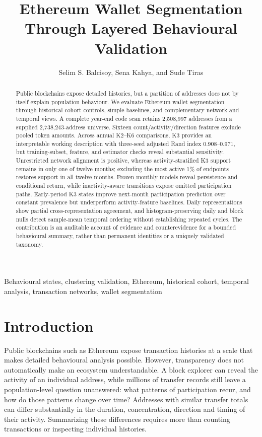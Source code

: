 \documentclass[journal,letterpaper]{IEEEtran}
\title{Ethereum Wallet Segmentation Through Layered Behavioural Validation}
\author{Selim S. Balcisoy, Sena Kahya, and Sude Tiras}
\begin{document}
\maketitle

\begin{abstract}
Public blockchains expose detailed histories, but a partition of addresses does not by itself explain population behaviour. We evaluate Ethereum wallet segmentation through historical cohort controls, simple baselines, and complementary network and temporal views. A complete year-end code scan retains 2,508,997 addresses from a supplied 2,738,243-address universe. Sixteen count/activity/direction features exclude pooled token amounts. Across annual K2--K6 comparisons, K3 provides an interpretable working description with three-seed adjusted Rand index 0.908--0.971, but training-subset, feature, and estimator checks reveal substantial sensitivity. Unrestricted network alignment is positive, whereas activity-stratified K3 support remains in only one of twelve months; excluding the most active 1\% of endpoints restores support in all twelve months. Frozen monthly models reveal persistence and conditional return, while inactivity-aware transitions expose omitted participation paths. Early-period K3 states improve next-month participation prediction over constant prevalence but underperform activity-feature baselines. Daily representations show partial cross-representation agreement, and histogram-preserving daily and block nulls detect sample-mean temporal ordering without establishing repeated cycles. The contribution is an auditable account of evidence and counterevidence for a bounded behavioural summary, rather than permanent identities or a uniquely validated taxonomy.
\end{abstract}

\begin{IEEEkeywords}
Behavioural states, clustering validation, Ethereum, historical cohort, temporal analysis, transaction networks, wallet segmentation
\end{IEEEkeywords}

\section{Introduction}
Public blockchains such as Ethereum expose transaction histories at a scale that makes detailed behavioural analysis possible. However, transparency does not automatically make an ecosystem understandable. A block explorer can reveal the activity of an individual address, while millions of transfer records still leave a population-level question unanswered: what patterns of participation recur, and how do those patterns change over time? Addresses with similar transfer totals can differ substantially in the duration, concentration, direction and timing of their activity. Summarizing these differences requires more than counting transactions or inspecting individual histories.
\end{document}
